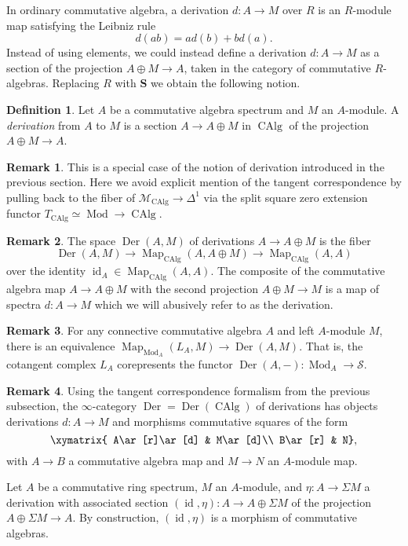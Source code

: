 \documentclass[12pt]{article}
\theoremstyle{definition}
\newtheorem{definition}{Definition}[subsection]
\newtheorem{remark}{Remark}[subsection]
\newcommand{\M}{\mathcal{M}}
\renewcommand{\S}{\mathcal{S}}
\renewcommand{\SS}{\mathbf{S}}
\newcommand{\too}{\longrightarrow}
\DeclareMathOperator{\Mod}{Mod}
\DeclareMathOperator{\CAlg}{CAlg}
\DeclareMathOperator{\Der}{Der}
\DeclareMathOperator{\id}{id}
\DeclareMathOperator{\Map}{Map}
\begin{document}
In ordinary commutative algebra, a derivation $d:A\to M$ over $R$ is an $R$-module map satisfying the Leibniz rule
\[
d(ab)=ad(b)+bd(a).
\]
Instead of using elements, we could instead define a derivation $d:A\to M$ as a section of the projection $A\oplus M\to A$, taken in the category of commutative $R$-algebras.
Replacing $R$ with $\SS$ we obtain the following notion.
\begin{definition}
Let $A$ be a commutative algebra spectrum and $M$ an $A$-module.
A {\em derivation} from $A$ to $M$ is a section $A\to A\oplus M$ in $\CAlg$ of the projection $A\oplus M\to A$.
\end{definition}
\begin{remark}
This is a special case of the notion of derivation introduced in the previous section.
Here we avoid explicit mention of the tangent correspondence by pulling back to the fiber of $\M_{\CAlg}\to\Delta^1$ via the split square zero extension functor $T_{\CAlg}\simeq\Mod\to\CAlg$.
\end{remark}
\begin{remark}
The space $\Der(A,M)$
\index{$\Der(A,M)$}
of derivations $A\to A\oplus M$ is the fiber
\[
\Der(A,M)\too\Map_{\CAlg}(A,A\oplus M)\too\Map_{\CAlg}(A,A)
\]
over the identity $\id_A\in\Map_{\CAlg}(A,A)$.
The composite of the commutative algebra map $A\to A\oplus M$ with the second projection $A\oplus M\to M$ is a map of spectra $d:A\to M$ which we will abusively refer to as the derivation.
\end{remark}
\begin{remark}
For any connective commutative algebra $A$ and left $A$-module $M$, there is an equivalence
$
\Map_{\Mod_A}(L_{A},M)\to\Der(A,M).
$
That is, the cotangent complex $L_A$ corepresents the functor $\Der(A,-):\Mod_A\to\S$.
\end{remark}

\begin{remark}
Using the tangent correspondence formalism from the previous subsection, the $\infty$-category $\Der=\Der(\CAlg)$
\index{$\Der$}
of derivations has objects derivations $d:A\to M$ and morphisms commutative squares of the form
\[
\xymatrix{
A\ar[r]\ar[d] & M\ar[d]\\
B\ar[r] & N},
\]
with $A\to B$ a commutative algebra map and $M\to N$ an $A$-module map.
\end{remark}


Let $A$ be a commutative ring spectrum, $M$ an $A$-module, and $\eta:A\to\Sigma M$ a derivation with associated section $(\id,\eta):A\to A\oplus\Sigma M$ of the projection $A\oplus\Sigma M\to A$.
By construction, $(\id,\eta)$ is a morphism of commutative algebras.
\end{document}
